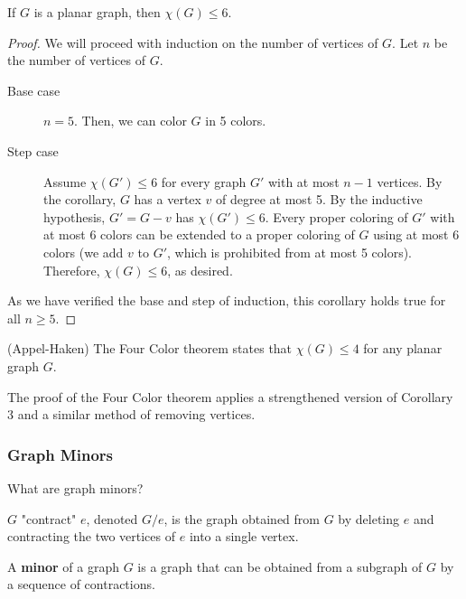 \documentclass[a4paper]{article}
\begin{document}
\begin{corollary}
	If \( G \) is a planar graph, then \( \chi(G) \le 6 \).
\end{corollary}

\begin{proof}
	We will proceed with induction on the number of vertices of \( G \). Let \( n \) be the number of vertices of \( G \).
	\begin{description}
		\item[Base case] \( n=5 \). Then, we can color \( G \) in 5 colors.
		\item[Step case] Assume \( \chi(G') \le 6 \) for every graph \( G' \) with at most \( n -1  \) vertices. By the corollary, \( G \) has a vertex \( v \) of degree at most 5. By the inductive hypothesis, \( G' = G - v \) has \( \chi(G') \le 6 \). Every proper coloring of \( G' \) with at most 6 colors can be extended to a proper coloring of \( G \) using at most 6 colors (we add \( v \) to \( G' \), which is prohibited from at most 5 colors). Therefore, \( \chi(G) \le 6 \), as desired.
	\end{description}
	As we have verified the base and step of induction, this corollary holds true for all \( n\ge 5 \).
\end{proof}

\begin{theorem}
	(Appel-Haken) The Four Color theorem states that \( \chi(G) \le 4 \) for any planar graph \( G \).
\end{theorem}

\begin{note}
	The proof of the Four Color theorem applies a strengthened version of Corollary 3 and a similar method of removing vertices.
\end{note}

\subsubsection{Graph Minors}

What are graph minors?

\begin{definition}
	\( G \) "contract" \( e \), denoted \( G / e \), is the graph obtained from \( G \) by deleting \( e \) and contracting the two vertices of \( e \) into a single vertex.
\end{definition}

\begin{definition}
	A \textbf{minor} of a graph \( G \) is a graph that can be obtained from a subgraph of \( G \) by a sequence of contractions.
\end{definition}
\end{document}
